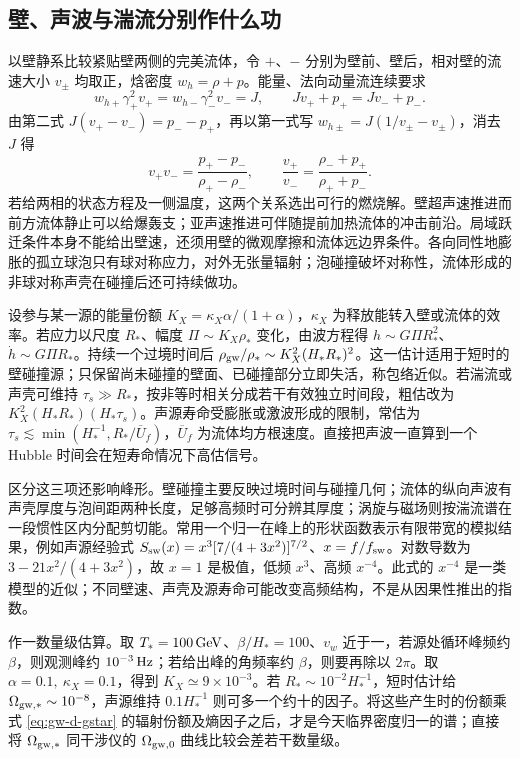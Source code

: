 \subsection{壁、声波与湍流分别作什么功}

以壁静系比较紧贴壁两侧的完美流体，令 $+$、$-$ 分别为壁前、壁后，相对壁的流速大小 $v_\pm$ 均取正，焓密度 $w_{\!h}=\rho+p$。能量、法向动量流连续要求
\[
 w_{\!h+}\gamma_+^2v_+=w_{\!h-}\gamma_-^2v_-=J,\qquad
 Jv_++p_+=Jv_-+p_- .
\]
由第二式 $J(v_+-v_-)=p_--p_+$，再以第一式写 $w_{\!h\pm}=J(1/v_\pm-v_\pm)$，消去 $J$ 得
\[
 v_+v_-=\frac{p_+-p_-}{\rho_+-\rho_-},\qquad
 \frac{v_+}{v_-}=\frac{\rho_-+p_+}{\rho_++p_-}.
\]
若给两相的状态方程及一侧温度，这两个关系选出可行的燃烧解。壁超声速推进而前方流体静止可以给爆轰支；亚声速推进可伴随提前加热流体的冲击前沿。局域跃迁条件本身不能给出壁速，还须用壁的微观摩擦和流体远边界条件。各向同性地膨胀的孤立球泡只有球对称应力，对外无张量辐射；泡碰撞破坏对称性，流体形成的非球对称声壳在碰撞后还可持续做功。

设参与某一源的能量份额 $K_X=\kappa_X\alpha/(1+\alpha)$，$\kappa_X$ 为释放能转入壁或流体的效率。若应力以尺度 $R_*$、幅度 $\Pi\sim K_X\rho_*$ 变化，由波方程得 $h\sim G\Pi R_*^2$、$\dot h\sim G\Pi R_*$。持续一个过境时间后 $\rho_{\rm gw}/\rho_*\sim K_X^2(H_*R_*)^2$。这一估计适用于短时的壁碰撞源；只保留尚未碰撞的壁面、已碰撞部分立即失活，称包络近似。若湍流或声壳可维持 $\tau_s\gg R_*$，按非等时相关分成若干有效独立时间段，粗估改为 $K_X^2(H_*R_*)(H_*\tau_s)$。声源寿命受膨胀或激波形成的限制，常估为 $\tau_s\lesssim\min(H_*^{-1},R_*/\overline U_f)$，$\overline U_f$ 为流体均方根速度。直接把声波一直算到一个 Hubble 时间会在短寿命情况下高估信号。

区分这三项还影响峰形。壁碰撞主要反映过境时间与碰撞几何；流体的纵向声波有声壳厚度与泡间距两种长度，足够高频时可分辨其厚度；涡旋与磁场则按湍流谱在一段惯性区内分配剪切能。常用一个归一在峰上的形状函数表示有限带宽的模拟结果，例如声源经验式 $S_{\rm sw}(x)=x^3[7/(4+3x^2)]^{7/2}$、$x=f/f_{\rm sw}$。对数导数为 $3-21x^2/(4+3x^2)$，故 $x=1$ 是极值，低频 $x^3$、高频 $x^{-4}$。此式的 $x^{-4}$ 是一类模型的近似；不同壁速、声壳及源寿命可能改变高频结构，不是从因果性推出的指数。

作一数量级估算。取 $T_*=100\,{\rm GeV}$、$\beta/H_*=100$、$v_w$ 近于一，若源处循环峰频约 $\beta$，则观测峰约 $10^{-3}\,{\rm Hz}$；若给出峰的角频率约 $\beta$，则要再除以 $2\pi$。取 $\alpha=0.1,\ \kappa_X=0.1$，得到 $K_X\simeq9\times10^{-3}$。若 $R_*\sim10^{-2}H_*^{-1}$，短时估计给 $\Omega_{{\rm gw},*}\sim10^{-8}$，声源维持 $0.1H_*^{-1}$ 则可多一个约十的因子。将这些产生时的份额乘式 \eqref{eq:gw-d-gstar} 的辐射份额及熵因子之后，才是今天临界密度归一的谱；直接将 $\Omega_{{\rm gw},*}$ 同干涉仪的 $\Omega_{{\rm gw},0}$ 曲线比较会差若干数量级。


